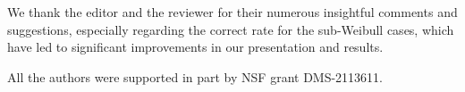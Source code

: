\documentclass[aos]{imsart}
\begin{document}
\begin{acks}[Acknowledgments]
We thank the editor and the reviewer for their numerous insightful comments and suggestions, especially regarding the correct rate for the sub-Weibull cases, which have led to significant improvements in our presentation and results.
\end{acks}
\begin{funding}
All the authors were supported in part by NSF grant DMS-2113611.
\end{funding}

\begin{supplement}
\end{supplement}

\end{document}
